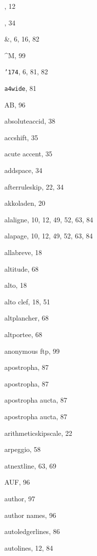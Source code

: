 \begin{theindex}

  \item {\tt{}}, 12
  \item *, 34
  \item \&, 6, 16, 82
  \item \^{}M, 99
  \item {\tt\char'174}, 6, 81, 82

  \indexspace

  \item {\tt  a4wide}, 81
  \item {\Bslash AB}, 96
  \item {\Bslash absoluteaccid}, 38
  \item {\Bslash accshift}, 35
  \item acute accent, 35
  \item {\Bslash addspace}, 34
  \item {\Bslash afterruleskip}, 22, 34
  \item {\Bslash akkoladen}, 20
  \item {\Bslash alaligne}, 10, 12, 49, 52, 63, 84
  \item {\Bslash alapage}, 10, 12, 49, 52, 63, 84
  \item {\Bslash allabreve}, 18
  \item {\Bslash altitude}, 68
  \item {\Bslash alto}, 18
  \item alto clef, 18, 51
  \item {\Bslash altplancher}, 68
  \item {\Bslash altportee}, 68
  \item anonymous ftp, 99
  \item apostropha, 87
  \item {\Bslash apostropha}, 87
  \item apostropha aucta, 87
  \item {\Bslash apostropha aucta}, 87
  \item {\Bslash arithmeticskipscale}, 22
  \item {\Bslash arpeggio}, 58
  \item {\Bslash atnextline}, 63, 69
  \item {\Bslash AUF}, 96
  \item {\Bslash author}, 97
  \item author names, 96
  \item {\Bslash autoledgerlines}, 86
  \item {\Bslash autolines}, 12, 84


\end{theindex}
